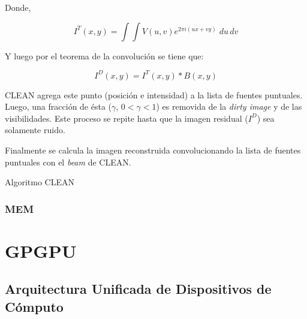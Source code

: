 Donde,

\begin{equation}
I^{T}(x,y) = \int\int V(u,v)e^{2\pi i(ux+vy)}\;du\,dv
\label{eq:fullcoverage}
\end{equation} 

Y luego por el teorema de la convolución se tiene que:

\begin{equation}
I^{D}(x,y) = I^{T}(x,y) \ast B(x,y)
\end{equation}

CLEAN agrega este punto (posición e intensidad) a la lista de fuentes puntuales. Luego, una fracción de ésta ($\gamma$, $0 < \gamma < 1$) es removida de la \textit{dirty image} y de las visibilidades. Este proceso se repite hasta que la imagen residual ($I^{D}$) sea solamente ruido.

Finalmente se calcula la imagen reconstruida convolucionando la lista de fuentes puntuales con el \textit{beam} de CLEAN.

\begin{algorithm}
\begin{algorithmic}[1]
        \ENDFOR
    \ENDWHILE
\end{algorithmic}
\label{alg:clean}
\caption{Algoritmo CLEAN}
\end{algorithm}


\subsection{MEM}

 
 










\chapter{GPGPU}
\label{cap:gpgpu}

\section{Arquitectura Unificada de Dispositivos de Cómputo}
